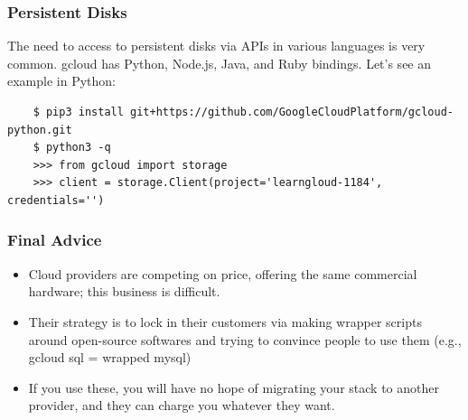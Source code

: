 \documentclass[9pt]{beamer}
\begin{document}
\begin{frame}[fragile]
  \frametitle{Persistent Disks}
  The need to access to persistent disks via APIs in various languages is very common. gcloud has Python, Node.js, Java, and Ruby bindings. Let's see an example in Python:
  \begin{verbatim}
    $ pip3 install git+https://github.com/GoogleCloudPlatform/gcloud-python.git
    $ python3 -q
    >>> from gcloud import storage
    >>> client = storage.Client(project='learngloud-1184', credentials='')
  \end{verbatim}
\end{frame}

\begin{frame}[fragile]
  \frametitle{Final Advice}
  \begin{itemize}
  \item Cloud providers are competing on price, offering the same commercial hardware; this business is difficult.
  \item Their strategy is to lock in their customers via making wrapper scripts around open-source softwares and trying to convince people to use them (e.g., gcloud sql = wrapped mysql) 
  \item If you use these, you will have no hope of migrating your stack to another provider, and they can charge you whatever they want.
  \end{itemize}
\end{frame}
\end{document}
